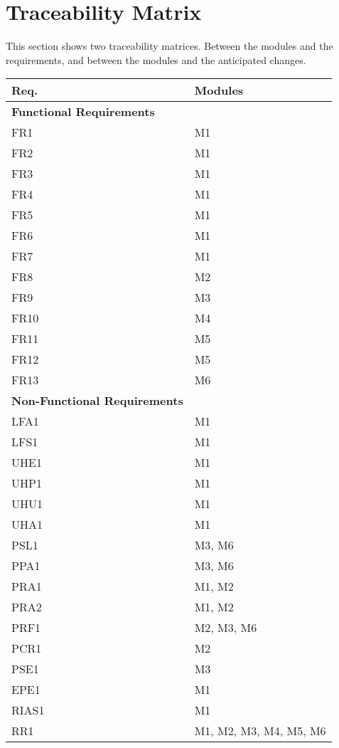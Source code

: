 \documentclass[12pt, titlepage]{article}
\begin{document}
\section{Traceability Matrix}
This section shows two traceability matrices. Between the modules and the requirements, and between the modules and the anticipated changes.


\begin{table}[H]
    \centering
    \begin{tabular}{p{} p{}}
        \toprule
        \textbf{Req.} & \textbf{Modules}\\
        \midrule
        \textbf{Functional Requirements}\\
        \midrule
        FR1 & M1\\
        FR2 & M1\\
        FR3 & M1\\
        FR4 & M1\\
        FR5 & M1\\
        FR6 & M1\\
        FR7 & M1\\
        FR8 & M2\\
        FR9 & M3\\
        FR10 & M4\\
        FR11 & M5\\
        FR12 & M5\\
        FR13 & M6\\
        \midrule
        \textbf{Non-Functional Requirements}\\
        \midrule
        LFA1 & M1\\
        LFS1 & M1\\
        UHE1 & M1 \\
        UHP1 & M1 \\
        UHU1 & M1 \\
        UHA1 & M1 \\
        PSL1 & M3, M6 \\
        PPA1 &  M3, M6\\ 
        PRA1 & M1, M2 \\
        PRA2 & M1, M2 \\
        PRF1 & M2, M3, M6 \\
        PCR1 & M2 \\
        PSE1 & M3 \\
        EPE1 & M1 \\
        RIAS1 & M1 \\
        RR1 & M1, M2, M3, M4, M5, M6 \\

\end{tabular}
\end{table}
\end{document}
